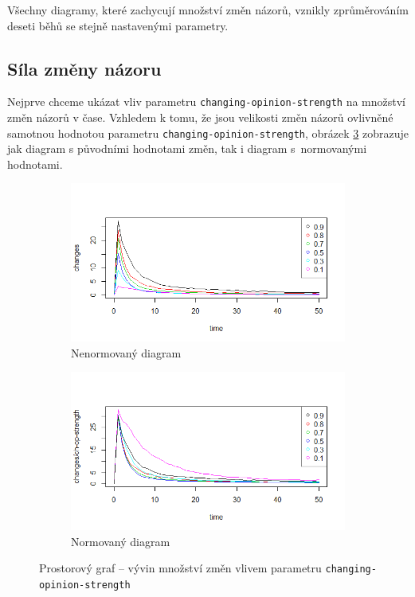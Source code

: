 \documentclass[10pt,a4paper]{report}
\begin{document}
Všechny diagramy, které zachycují množství změn názorů, vznikly zprů\-mě\-ro\-vá\-ním deseti běhů se stejně nastavenými parametry.

\subsection{Síla změny názoru}
Nejprve chceme ukázat vliv parametru \texttt{changing-opinion-strength} na množ\-ství změn názorů v čase. Vzhledem k tomu, že jsou velikosti změn názorů ovlivněné samotnou hodnotou parametru \texttt{changing-opinion-strength}, obrá\-zek \ref{fig:zmeny-nenormovany-normovany} zobrazuje jak diagram s původními hodnotami změn, tak i diagram s~normovanými hodnotami. 

\begin{figure}[h]
\begin{subfigure}{.5\textwidth}
  \centering
  \includegraphics[width=1\linewidth]{plots/spatial-g/spatialChanges1-9.png}
  \caption{Nenormovaný diagram}
  \label{fig:zmeny-nenormovany}
\end{subfigure}%
\begin{subfigure}{.5\textwidth}
  \centering
  
  \includegraphics[width=1\linewidth]{plots/spatial-g/spatialChanges1-9norm.png}
  \caption{Normovaný diagram}
  \label{fig:zmeny-normovany}
\end{subfigure}
\caption{Prostorový graf -- vývin množství změn vlivem parametru \texttt{changing-opinion-strength}}
\label{fig:zmeny-nenormovany-normovany}
\end{figure}
\end{document}
